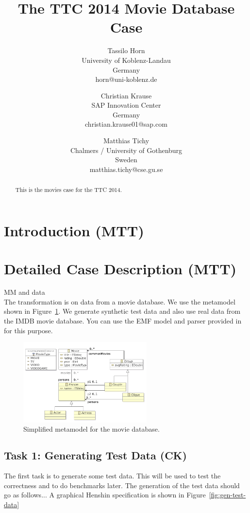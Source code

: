 \documentclass[a4paper]{article}
\title{The TTC 2014 Movie Database Case}
\author{
Tassilo Horn\\ University of Koblenz-Landau\\ Germany\\ horn@uni-koblenz.de
\and
Christian Krause\\ SAP Innovation Center\\ Germany\\ christian.krause01@sap.com
\and
Matthias Tichy\\ Chalmers / University of Gothenburg\\ Sweden\\ matthias.tichy@cse.gu.se
}
\begin{document}
\maketitle

\begin{abstract}
This is the movies case for the TTC 2014.
\end{abstract}
\vskip 32pt


\section{Introduction (MTT)}


\section{Detailed Case Description (MTT)}

MM and data\\

The transformation is on data from a movie database.
We use the metamodel shown in Figure~\ref{fig:metamodel}.
We generate synthetic test data and also use real data
from the IMDB movie database. You can use the EMF model and
parser provided in \cite{IMDB2EMF} for this purpose.


\begin{figure}[ht]
\centering
\includegraphics[width=0.6\textwidth]{movies}
\caption{Simplified metamodel for the movie database.}
\label{fig:metamodel}
\end{figure}

\subsection{Task 1: Generating Test Data (CK)}
\label{sec:gen-test-data}

The first task is to generate some test data.
This will be used to test the correctness and to do benchmarks later.
The generation of the test data should go as follows...
A graphical Henshin specification is shown in Figure~\ref{fig:gen-test-data}
\end{document}
